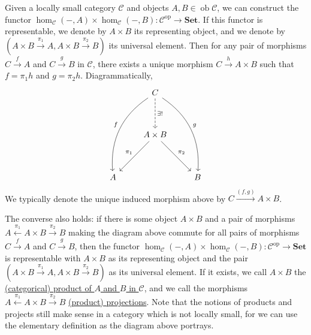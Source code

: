 \documentclass[a4paper,11pt]{article}
\theoremstyle{break_italics}
\theoremstyle{break_upright}
\theoremstyle{remark}
\newcommand{\ob}{\operatorname{ob}}
\newcommand{\C}{\mathcal{C}}
\newcommand{\Set}{\mathbf{Set}}
\newcommand{\op}{\mathrm{op}}
\begin{document}
Given a locally small category $\C$ and objects $A,B \in \ob\C$, we can construct the functor $\hom_\C(-, A) \times \hom_\C(-, B) \colon \C^\op \to \Set$. If this functor is representable, we denote by $A \times B$ its representing object, and we denote by $(A \times B \xrightarrow{\pi_1} A, A \times B \xrightarrow{\pi_2} B)$ its universal element. Then for any pair of morphisms $C \xrightarrow{f} A$ and $C \xrightarrow{g} B$ in $\C$, there exists a unique morphism $C \xrightarrow{h} A \times B$ such that $f = \pi_1h$ and $g = \pi_2h$. Diagrammatically,
\[
\begin{tikzcd}
  & C \arrow[ldddd, "f"', bend right] \arrow[rdddd, "g", bend left] \arrow[dd, "\exists !", dashed] &   \\
  &                                                                                                 &   \\
  & A \times B \arrow[ldd, "\pi_1"'] \arrow[rdd, "\pi_2"]                                           &   \\
  &                                                                                                 &   \\
A &                                                                                                 & B
\end{tikzcd}
\]
We typically denote the unique induced morphism above by $C \xrightarrow{(f,g)} A \times B$.

The converse also holds: if there is some object $A \times B$ and a pair of morphisms $A \xleftarrow{\pi_1} A \times B \xrightarrow{\pi_2} B$ making the diagram above commute for all pairs of morphisms $C \xrightarrow{f} A$ and $C \xrightarrow{g} B$, then the functor $\hom_\C(-, A) \times \hom_\C(-, B) \colon \C^\op \to \Set$ is representable with $A \times B$ as its representing object and the pair $(A \times B \xrightarrow{\pi_1} A, A \times B \xrightarrow{\pi_2} B)$ as its universal element. If it exists, we call $A \times B$ the \uline{(categorical) product of $A$ and $B$ in $\C$}, and we call the morphisms $A \xleftarrow{\pi_1} A \times B \xrightarrow{\pi_2} B$ \uline{(product) projections}. Note that the notions of products and projects still make sense in a category which is not locally small, for we can use the elementary definition as the diagram above portrays.
\end{document}

